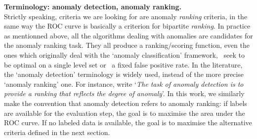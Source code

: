 \begin{remark}{\bf Terminology: anomaly detection, anomaly ranking.\\}
Strictly speaking, criteria we are looking for are anomaly \emph{ranking} criteria, in the same way the ROC curve is basically a criterion for bipartite \emph{ranking}.
%
In practice as mentionned above, all the algorithms dealing with anomalies are candidates for the anomaly ranking task. They all produce a ranking/scoring function, even the ones which originally deal with the `anomaly classification' framework, %
\ie~seek to be optimal on a single level set or \wrt~a fixed false positive rate.
In the literature, the `anomaly detection' terminology is widely used, instead of the more precise `anomaly ranking' one. For instance, \cite{Liu2008} write `\emph{The task of anomaly detection is to provide a ranking that reflects the degree of anomaly}'.
%
In this work, we similarly make the convention that anomaly detection refers to anomaly ranking: if labels are available for the evaluation step, the goal is to maximise the area under the ROC curve. If no labeled data is available, the goal is to maximise the alternative criteria defined in the next section.





\end{remark}
